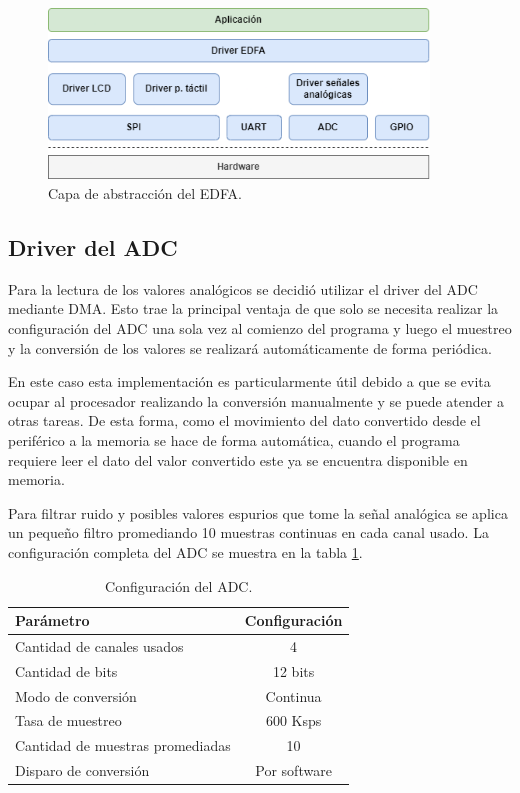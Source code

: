 \begin{figure}[H]
\centering
\includegraphics[width=0.9\textwidth]{./Figures/halamp.png}
\caption{Capa de abstracción del EDFA.}
\label{fig:halAmp}
\end{figure}

\subsection{Driver del ADC}

Para la lectura de los valores analógicos se decidió utilizar el driver del ADC mediante DMA. Esto trae la principal ventaja de que solo se necesita realizar la configuración del ADC una sola vez al comienzo del programa y luego el muestreo y la conversión de los valores se realizará automáticamente de forma periódica.

En este caso esta implementación es particularmente útil debido a que se evita ocupar al procesador realizando la conversión manualmente y se puede atender a otras tareas. De esta forma, como el movimiento del dato convertido desde el periférico a la memoria se hace de forma automática, cuando el programa requiere leer el dato del valor convertido este ya se encuentra disponible en memoria.

Para filtrar ruido y posibles valores espurios que tome la señal analógica se aplica un pequeño filtro promediando 10 muestras continuas en cada canal usado. La configuración completa del ADC se muestra en la tabla \ref{tab:configADC}.

\begin{table}[H]
	\centering
	\caption{Configuración del ADC.}
	\begin{tabular}{l c}
		\toprule
		\textbf{Parámetro} & \textbf{Configuración}  \\
		\midrule
		Cantidad de canales usados & 4		\\
		Cantidad de bits		& 12 bits 	 		 \\
		Modo de conversión		& Continua   \\
		Tasa de muestreo		& 600 Ksps	 \\
		Cantidad de muestras promediadas	& 10 \\
		Disparo de conversión	& Por software \\
		\bottomrule
		\hline
	\end{tabular}
	\label{tab:configADC}
\end{table}

